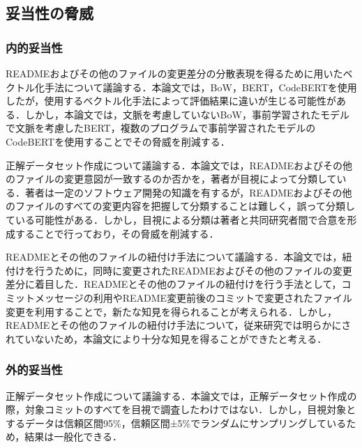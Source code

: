 \documentclass[submit]{ipsj}
\begin{document}







\subsection{妥当性の脅威}
\subsubsection{内的妥当性}
READMEおよびその他のファイルの変更差分の分散表現を得るために用いたベクトル化手法について議論する．本論文では，BoW，BERT，CodeBERTを使用したが，使用するベクトル化手法によって評価結果に違いが生じる可能性がある．しかし，本論文では，文脈を考慮していないBoW，事前学習されたモデルで文脈を考慮したBERT，複数のプログラムで事前学習されたモデルのCodeBERTを使用することでその脅威を削減する．

正解データセット作成について議論する．本論文では，READMEおよびその他のファイルの変更意図が一致するのか否かを，著者が目視によって分類している．著者は一定のソフトウェア開発の知識を有するが，READMEおよびその他のファイルのすべての変更内容を把握して分類することは難しく，誤って分類している可能性がある．しかし，目視による分類は著者と共同研究者間で合意を形成することで行っており，その脅威を削減する．



READMEとその他のファイルの紐付け手法について議論する．本論文では，紐付けを行うために，同時に変更されたREADMEおよびその他のファイルの変更差分に着目した．READMEとその他のファイルの紐付けを行う手法として，コミットメッセージの利用やREADME変更前後のコミットで変更されたファイル変更を利用することで，新たな知見を得られることが考えられる．しかし，READMEとその他のファイルの紐付け手法について，従来研究では明らかにされていないため，本論文により十分な知見を得ることができたと考える．



\subsubsection{外的妥当性}
正解データセット作成について議論する．本論文では，正解データセット作成の際，対象コミットのすべてを目視で調査したわけではない．しかし，目視対象とするデータは信頼区間95\%，信頼区間±5\%でランダムにサンプリングしているため，結果は一般化できる．
\end{document}
